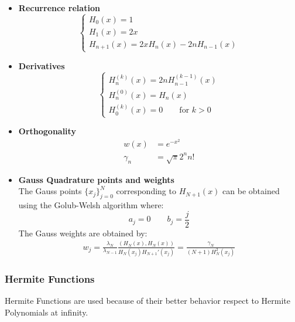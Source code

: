 \documentclass[a4paper,10pt]{article}
\begin{document}
\begin{itemize}
\item \textbf{Recurrence relation} 
	\begin{equation}
		\begin{cases}
		H_0(x) = 1 \\
		H_1(x) = 2x \\
		H_{n+1}(x) = 2xH_n(x) - 2nH_{n-1}(x)
		\end{cases}
	\end{equation}
\item \textbf{Derivatives} 
	\begin{equation}
		\begin{cases}
		H_n^{(k)}(x) = 2nH_{n-1}^{(k-1)}(x) \\
		H_n^{(0)}(x) = H_n(x) \\
		H_0^{(k)}(x) = 0 \qquad \text{for $k>0$}
		\end{cases}
	\end{equation}
\item \textbf{Orthogonality} 
	\begin{align}
		w(x) &= e^{-x^2} \\
		\gamma_n &= \sqrt{\pi} 2^n n!
	\end{align}
\item \textbf{Gauss Quadrature points and weights}\\
	The Gauss points $\lbrace x_j \rbrace_{j=0}^N$ corresponding to $H_{N+1}(x)$ can be obtained using the Golub-Welsh algorithm \cite{press_numerical_2007} where:
	\begin{equation}\label{eq:OrthPoly:HermitePolyPhy:GQx}
	a_j = 0 \qquad b_j = \frac{j}{2}
	\end{equation}
	The Gauss weights are obtained by:
	\begin{align}
	w_j = \frac{\lambda_N}{\lambda_{N-1}} \frac{(H_N(x),H_N(x))}{H_N(x_j)H_{N+1}'(x_j)} = \frac{\gamma_N}{(N+1)H_N^2(x_j)}
	\end{align}
\end{itemize}

\subsubsection{Hermite Functions}
Hermite Functions are used because of their better behavior respect to Hermite Polynomials at infinity.
\end{document}
